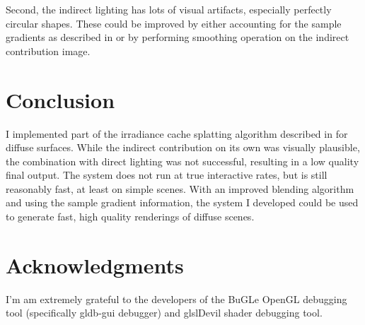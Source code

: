 \documentclass[10pt,twopage]{acmsiggraph}
\begin{document}
Second, the indirect lighting has lots of visual artifacts, especially perfectly circular shapes.  These could be improved by either accounting for the sample gradients as described in \cite{mainpaper} or by performing smoothing operation on the indirect contribution image.  

\section{Conclusion}
I implemented part of the irradiance cache splatting algorithm described in \cite{mainpaper} for diffuse surfaces.  While the indirect contribution on its own was visually plausible, the combination with direct lighting was not successful, resulting in a low quality final output.  The system does not run at true interactive rates, but is still reasonably fast, at least on simple scenes.  With an improved blending algorithm and using the sample gradient information, the system I developed could be used to generate fast, high quality renderings of diffuse scenes.

\section*{Acknowledgments}
I'm am extremely grateful to the developers of the BuGLe OpenGL debugging tool (specifically gldb-gui debugger) and glslDevil shader debugging tool.


{\small}

%
%


\cleardoublepage
\end{document}
